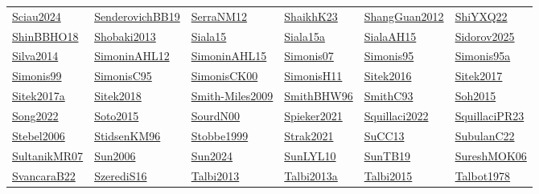 \begin{longtable}{*{6}{l}}
\hyperref[detail:Sciau2024]{Sciau2024} & \hyperref[detail:SenderovichBB19]{SenderovichBB19} & \hyperref[detail:SerraNM12]{SerraNM12} & \hyperref[detail:ShaikhK23]{ShaikhK23} & \hyperref[detail:ShangGuan2012]{ShangGuan2012} & \hyperref[detail:ShiYXQ22]{ShiYXQ22}\\ 
\hyperref[detail:ShinBBHO18]{ShinBBHO18} & \hyperref[detail:Shobaki2013]{Shobaki2013} & \hyperref[detail:Siala15]{Siala15} & \hyperref[detail:Siala15a]{Siala15a} & \hyperref[detail:SialaAH15]{SialaAH15} & \hyperref[detail:Sidorov2025]{Sidorov2025}\\ 
\hyperref[detail:Silva2014]{Silva2014} & \hyperref[detail:SimoninAHL12]{SimoninAHL12} & \hyperref[detail:SimoninAHL15]{SimoninAHL15} & \hyperref[detail:Simonis07]{Simonis07} & \hyperref[detail:Simonis95]{Simonis95} & \hyperref[detail:Simonis95a]{Simonis95a}\\ 
\hyperref[detail:Simonis99]{Simonis99} & \hyperref[detail:SimonisC95]{SimonisC95} & \hyperref[detail:SimonisCK00]{SimonisCK00} & \hyperref[detail:SimonisH11]{SimonisH11} & \hyperref[detail:Sitek2016]{Sitek2016} & \hyperref[detail:Sitek2017]{Sitek2017}\\ 
\hyperref[detail:Sitek2017a]{Sitek2017a} & \hyperref[detail:Sitek2018]{Sitek2018} & \hyperref[detail:Smith-Miles2009]{Smith-Miles2009} & \hyperref[detail:SmithBHW96]{SmithBHW96} & \hyperref[detail:SmithC93]{SmithC93} & \hyperref[detail:Soh2015]{Soh2015}\\ 
\hyperref[detail:Song2022]{Song2022} & \hyperref[detail:Soto2015]{Soto2015} & \hyperref[detail:SourdN00]{SourdN00} & \hyperref[detail:Spieker2021]{Spieker2021} & \hyperref[detail:Squillaci2022]{Squillaci2022} & \hyperref[detail:SquillaciPR23]{SquillaciPR23}\\ 
\hyperref[detail:Stebel2006]{Stebel2006} & \hyperref[detail:StidsenKM96]{StidsenKM96} & \hyperref[detail:Stobbe1999]{Stobbe1999} & \hyperref[detail:Strak2021]{Strak2021} & \hyperref[detail:SuCC13]{SuCC13} & \hyperref[detail:SubulanC22]{SubulanC22}\\ 
\hyperref[detail:SultanikMR07]{SultanikMR07} & \hyperref[detail:Sun2006]{Sun2006} & \hyperref[detail:Sun2024]{Sun2024} & \hyperref[detail:SunLYL10]{SunLYL10} & \hyperref[detail:SunTB19]{SunTB19} & \hyperref[detail:SureshMOK06]{SureshMOK06}\\ 
\hyperref[detail:SvancaraB22]{SvancaraB22} & \hyperref[detail:SzerediS16]{SzerediS16} & \hyperref[detail:Talbi2013]{Talbi2013} & \hyperref[detail:Talbi2013a]{Talbi2013a} & \hyperref[detail:Talbi2015]{Talbi2015} & \hyperref[detail:Talbot1978]{Talbot1978}\\ 

\end{longtable}
